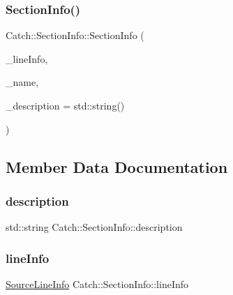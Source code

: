 \subsubsection{\texorpdfstring{Section\+Info()}{SectionInfo()}}
{\footnotesize\ttfamily Catch\+::\+Section\+Info\+::\+Section\+Info (\begin{DoxyParamCaption}\item[{\mbox{\hyperlink{struct_catch_1_1_source_line_info}{Source\+Line\+Info}} const \&}]{\+\_\+line\+Info,  }\item[{std\+::string const \&}]{\+\_\+name,  }\item[{std\+::string const \&}]{\+\_\+description = {\ttfamily std\+:\+:string()} }\end{DoxyParamCaption})}



\subsection{Member Data Documentation}
\mbox{\label{struct_catch_1_1_section_info_a0052060219a6de74bb7ade34d4163a4e}} 
\subsubsection{\texorpdfstring{description}{description}}
{\footnotesize\ttfamily std\+::string Catch\+::\+Section\+Info\+::description}

\mbox{\label{struct_catch_1_1_section_info_adbc83b8a3507c4acc8ee249e93465711}} 
\subsubsection{\texorpdfstring{line\+Info}{lineInfo}}
{\footnotesize\ttfamily \mbox{\hyperlink{struct_catch_1_1_source_line_info}{Source\+Line\+Info}} Catch\+::\+Section\+Info\+::line\+Info}

\mbox{\label{struct_catch_1_1_section_info_a704c8fc662d309137e0d4f199cb7df58}} 
